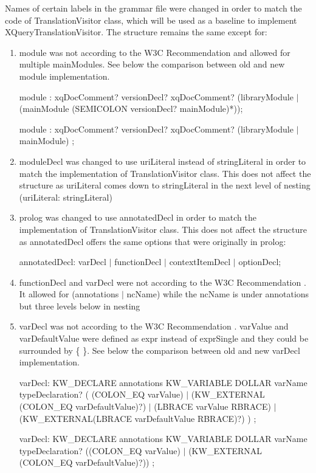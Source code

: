 Names of certain labels in the grammar file were changed in order to match the code of TranslationVisitor class, which will be used as a baseline to implement XQueryTranslationVisitor. The structure remains the same except for:
\begin{enumerate}
	
	\item module was not according to the W3C Recommendation \cite{XQueryRecommendation} and allowed for multiple mainModules. See below the comparison between old and new module implementation.
	
	module : xqDocComment? versionDecl? xqDocComment? (libraryModule $|$ (mainModule (SEMICOLON versionDecl? mainModule)*));
	
	module : xqDocComment? versionDecl? xqDocComment? (libraryModule $|$ mainModule) ;
	\item moduleDecl was changed to use uriLiteral instead of stringLiteral in order to match the implementation of TranslationVisitor class. This does not affect the structure as uriLiteral comes down to stringLiteral in the next level of nesting (uriLiteral: stringLiteral)
	\item prolog was changed to use annotatedDecl in order to match the implementation of TranslationVisitor class. This does not affect the structure as annotatedDecl offers the same options that were originally in prolog:
	
	annotatedDecl: varDecl $|$ functionDecl	$|$ contextItemDecl $|$ optionDecl;
	
	\item functionDecl and varDecl were not according to the W3C Recommendation \cite{XQueryRecommendation}. It allowed for (annotations $|$ ncName) while the ncName is under annotations but three levels below in nesting
 	
	\item varDecl was not according to the W3C Recommendation \cite{XQueryRecommendation}. varValue and varDefaultValue were defined as expr instead of exprSingle and they could be surrounded by \{ \}. See below the comparison between old and new varDecl implementation.
	
	varDecl: KW\_DECLARE annotations KW\_VARIABLE DOLLAR varName typeDeclaration?
	(
	(COLON\_EQ varValue)
	$|$ (KW\_EXTERNAL (COLON\_EQ varDefaultValue)?)
	$|$ (LBRACE varValue RBRACE)
	$|$ (KW\_EXTERNAL(LBRACE varDefaultValue RBRACE)?)
	) ; 
	
	varDecl: KW\_DECLARE annotations KW\_VARIABLE DOLLAR varName typeDeclaration?
	((COLON\_EQ varValue)
	$|$ (KW\_EXTERNAL (COLON\_EQ varDefaultValue)?)) ;
	

\end{enumerate}
